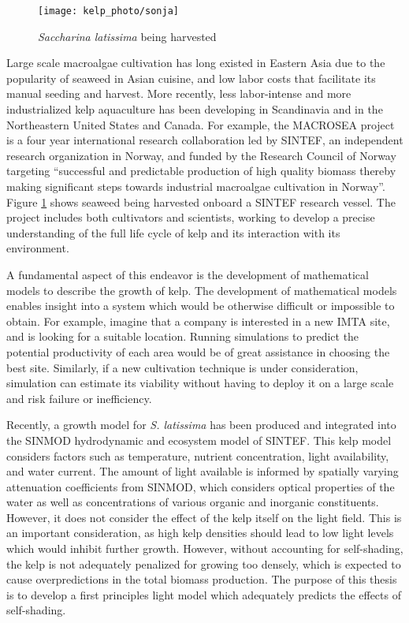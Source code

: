 \begin{figure}[h]
  \centering
  \texttt{[image: kelp\_photo/sonja]}
  \caption{\textit{Saccharina latissima} being harvested}
  \label{fig:sonja}
\end{figure}

Large scale macroalgae cultivation has long existed in Eastern Asia due to the popularity of seaweed in Asian cuisine, and low labor costs that facilitate its manual seeding and harvest.
  More recently, less labor-intense and more industrialized kelp aquaculture has been developing in Scandinavia and in the Northeastern United States and Canada.
For example, the MACROSEA project is a four year international research collaboration led by SINTEF, an independent research organization in Norway, and funded by the Research Council of Norway targeting ``successful and predictable production of high quality biomass thereby making significant steps towards industrial macroalgae cultivation in Norway''.
Figure \ref{fig:sonja} shows seaweed being harvested onboard a SINTEF research vessel.
The project includes both cultivators and scientists, working to develop a precise understanding of the full life cycle of kelp and its interaction with its environment.

A fundamental aspect of this endeavor is the development of mathematical models to describe the growth of kelp.
The development of mathematical models enables insight into a system which would be otherwise difficult or impossible to obtain.
For example, imagine that a company is interested in a new IMTA site, and is looking for a suitable location.
Running simulations to predict the potential productivity of each area would be of great assistance in choosing the best site.
Similarly, if a new cultivation technique is under consideration, simulation can estimate its viability without
having to deploy it on a large scale and risk failure or inefficiency.

Recently, a growth model \cite{broch_modelling_2012} for \textit{S. latissima} has been produced and integrated into the SINMOD \cite{wassmann_modelling_2006} hydrodynamic and ecosystem model of SINTEF.
This kelp model considers factors such as temperature, nutrient concentration, light availability, and water current.
The amount of light available is informed by spatially varying attenuation coefficients from SINMOD,
which considers optical properties of the water as well as concentrations of various organic and inorganic constituents.
However, it does not consider the effect of the kelp itself on the light field.
This is an important consideration, as high kelp densities should lead to low light levels which would inhibit further growth.
However, without accounting for self-shading, the kelp is not adequately penalized for growing too densely,
which is expected to cause overpredictions in the total biomass production.
The purpose of this thesis is to develop a first principles light model which adequately predicts the effects of self-shading.


